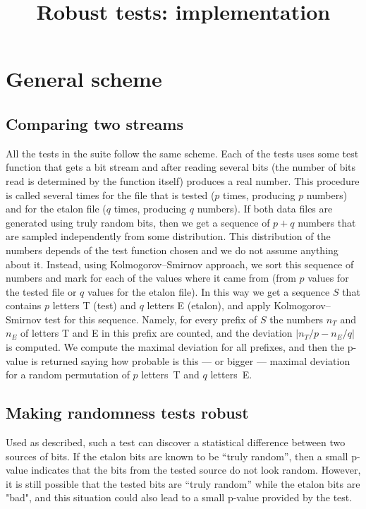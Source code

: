 \documentclass[12pt,a4paper,fullpage]{article}
\begin{document}
\title{Robust tests: implementation}
\author{}
\date{}
\maketitle


\section{General scheme}

\subsection{Comparing two streams}

All the tests in the suite follow the same scheme. Each of the tests uses some test function that gets a bit stream and after reading several bits (the number of bits read is determined by the function itself) produces a real number. This procedure is called several times for the file that is tested ($p$ times, producing $p$ numbers) and for the etalon file ($q$ times, producing $q$ numbers). If both data files are generated using truly random bits, then we get a sequence of $p+q$ numbers that are sampled independently from some distribution. This distribution of the numbers depends of the test function chosen and we do not assume anything about it. Instead, using Kolmogorov--Smirnov approach, we sort this sequence of numbers and mark for each of the values where it came from (from $p$ values for the tested file or $q$ values for the etalon file). In this way we get a sequence $S$ that contains $p$ letters T (test) and $q$ letters E (etalon), and apply Kolmogorov--Smirnov test for this sequence. Namely, for every prefix of $S$ the numbers $n_T$ and $n_E$ of letters T and E in this prefix are counted, and the deviation $|n_T/p - n_E/q|$ is computed.  We compute the maximal deviation for all prefixes, and then the p-value is returned saying how probable is this --- or bigger --- maximal deviation for a random permutation of $p$ letters~T and $q$ letters~E.

\subsection{Making randomness tests robust}

Used as described, such a test can discover a statistical difference between two sources of bits. If the etalon bits are known to be ``truly random'', then a small p-value indicates that the bits from the tested source do not look random. However, it is still possible that the tested bits are ``truly random'' while the etalon bits are "bad", and this situation could also lead to a small p-value provided by the test. 
\end{document}
